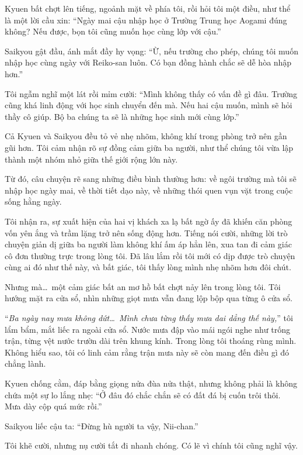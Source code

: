 \documentclass[../main.tex]{subfiles}
\begin{document}
Kyuen bất chợt lên tiếng, ngoảnh mặt về phía tôi, rồi hỏi tôi một điều, như thể là một lời cầu xin: ``Ngày mai cậu nhập học ở Trường Trung học Aogami đúng không? Nếu được, bọn tôi cũng muốn học cùng lớp với cậu.''

Saikyou gật đầu, ánh mắt đầy hy vọng: ``Ừ, nếu trường cho phép, chúng tôi muốn nhập học cùng ngày với Reiko-san luôn. Có bạn đồng hành chắc sẽ dễ hòa nhập hơn.''

Tôi ngẫm nghĩ một lát rồi mỉm cười: ``Mình không thấy có vấn đề gì đâu. Trường cũng khá linh động với học sinh chuyển đến mà. Nếu hai cậu muốn, mình sẽ hỏi thầy cô giúp. Bộ ba chúng ta sẽ là những học sinh mới cùng lớp.''

Cả Kyuen và Saikyou đều tỏ vẻ nhẹ nhõm, không khí trong phòng trở nên gần gũi hơn. Tôi cảm nhận rõ sự đồng cảm giữa ba người, như thể chúng tôi vừa lập thành một nhóm nhỏ giữa thế giới rộng lớn này.

\ct

Từ đó, câu chuyện rẽ sang những điều bình thường hơn: về ngôi trường mà tôi sẽ nhập học ngày mai, về thời tiết dạo này, về những thói quen vụn vặt trong cuộc sống hằng ngày.

Tôi nhận ra, sự xuất hiện của hai vị khách xa lạ bất ngờ ấy đã khiến căn phòng vốn yên ắng và trầm lặng trở nên sống động hơn. Tiếng nói cười, những lời trò chuyện giản dị giữa ba người làm không khí ấm áp hẳn lên, xua tan đi cảm giác cô đơn thường trực trong lòng tôi. Đã lâu lắm rồi tôi mới có dịp được trò chuyện cùng ai đó như thế này, và bất giác, tôi thấy lòng mình nhẹ nhõm hơn đôi chút.

Nhưng mà\dots\ một cảm giác bất an mơ hồ bất chợt nảy lên trong lòng tôi. Tôi hướng mặt ra cửa sổ, nhìn những giọt mưa vẫn đang lộp bộp qua từng ô cửa sổ.

``\textit{Ba ngày nay mưa không dứt\dots\ Mình chưa từng thấy mưa dai dẳng thế này,}'' tôi lẩm bẩm, mắt liếc ra ngoài cửa sổ. Nước mưa đập vào mái ngói nghe như trống trận, từng vệt nước trườn dài trên khung kính. Trong lòng tôi thoáng rùng mình. Không hiểu sao, tôi có linh cảm rằng trận mưa này sẽ còn mang đến điều gì đó chẳng lành.

Kyuen chống cằm, đáp bằng giọng nửa đùa nửa thật, nhưng không phải là không chứa một sự lo lắng nhẹ: ``Ở đâu đó chắc chắn sẽ có đất đá bị cuốn trôi thôi. Mưa dày cộp quá mức rồi.''

Saikyou liếc cậu ta: ``Đừng hù người ta vậy, Nii-chan.''

Tôi khẽ cười, nhưng nụ cười tắt đi nhanh chóng. Có lẽ vì chính tôi cũng nghĩ vậy.
\end{document}

